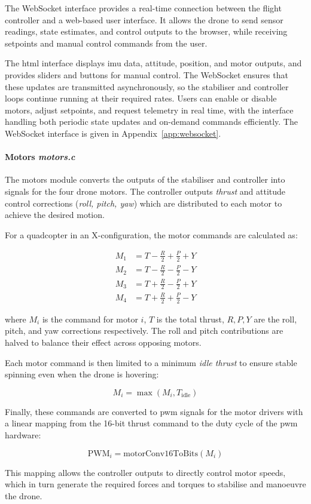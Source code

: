 The WebSocket interface provides a real-time connection between the flight controller and a web-based user interface. It allows the drone to send sensor readings, state estimates, and control outputs to the browser, while receiving setpoints and manual control commands from the user.  

The \gls{html} interface displays \gls{imu} data, attitude, position, and motor outputs, and provides sliders and buttons for manual control. The WebSocket ensures that these updates are transmitted asynchronously, so the stabiliser and controller loops continue running at their required rates. Users can enable or disable motors, adjust setpoints, and request telemetry in real time, with the interface handling both periodic state updates and on-demand commands efficiently. The WebSocket interface is given in Appendix~\ref{app:websocket}.

\paragraph{\textbf{Motors} \textit{motors.c}} \leavevmode

The motors module converts the outputs of the stabiliser and controller into signals for the four drone motors. The controller outputs \textit{thrust} and attitude control corrections (\textit{roll, pitch, yaw}) which are distributed to each motor to achieve the desired motion. 

\pagebreak
For a quadcopter in an X-configuration, the motor commands are calculated as:

\[
\begin{aligned}
M_1 &= T - \frac{R}{2} + \frac{P}{2} + Y \\
M_2 &= T - \frac{R}{2} - \frac{P}{2} - Y \\
M_3 &= T + \frac{R}{2} - \frac{P}{2} + Y \\
M_4 &= T + \frac{R}{2} + \frac{P}{2} - Y
\end{aligned}
\]

where \(M_i\) is the command for motor \(i\), \(T\) is the total thrust, \(R, P, Y\) are the roll, pitch, and yaw corrections respectively. The roll and pitch contributions are halved to balance their effect across opposing motors.  

Each motor command is then limited to a minimum \textit{idle thrust} to ensure stable spinning even when the drone is hovering:

\[
M_i = \max(M_i, T_\text{idle})
\]

Finally, these commands are converted to \gls{pwm} signals for the motor drivers with a linear mapping from the 16-bit thrust command to the duty cycle of the \gls{pwm} hardware:

\[
\text{PWM}_{i} = \text{motorConv16ToBits}(M_i)
\]

This mapping allows the controller outputs to directly control motor speeds, which in turn generate the required forces and torques to stabilise and manoeuvre the drone.